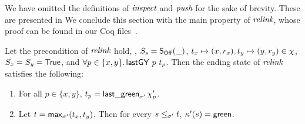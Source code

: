

We have omitted the definitions of $\textit{inspect}$ and $\textit{push}$
for the sake of brevity. These are presented in
%
%
\ifdefined{}
\fi
%
We conclude this section with the main property of $\textit{relink}$,
whose proof can be found in our Coq files~\cite{CoqFiles}.

\begin{lemma}\label{lem:relink-prefix}
Let the precondition of $\textit{relink}$ hold, \ie, $S_s = \mathsf{S_{Off}}(\_)$,
$t_x \mapsto (x, r_x), t_y \mapsto (y, r_y) \in \chi$, $S_x = S_y =
\mathsf{True}$, and $\forall p \in \{x,y\}\mathord{.}\, \mathsf{lastGY}\ p\ t_p$. Then the ending
state of $\textit{relink}$ satisfies the following:
 \begin{enumerate}
 \item\label{lem:relink-lgVy} For all $p \in \{x, y\}$, $t_p =
   \mathsf{last\_green}_{\sigma'}\, \chi_p'$.
 \item\label{lem:relink-green} Let $t = \mathsf{max}_{\sigma'}
   (t_x,t_y)$. Then for every $s \leq_{\sigma'}t$, $\kappa'(s) = \mathsf{green}$.
 \end{enumerate}
\end{lemma}



